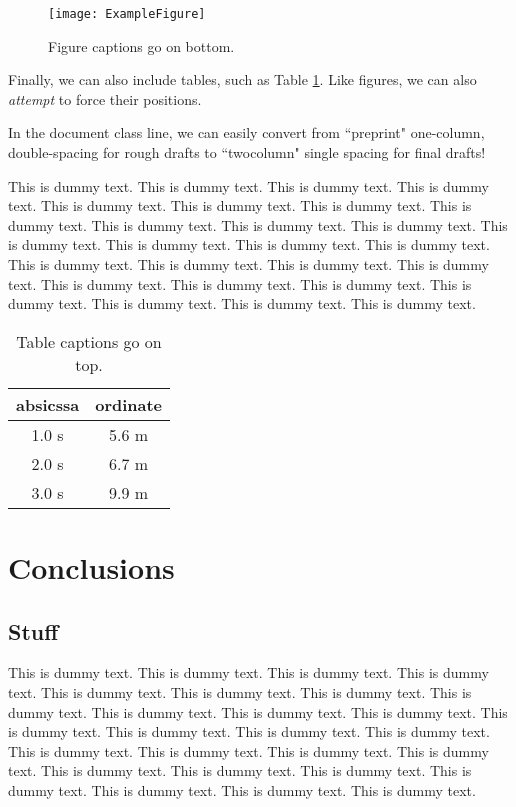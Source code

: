 \documentclass{book}
\begin{document}
\begin{figure}[ht] %
	\begin{center}
		\texttt{[image: ExampleFigure]} %
		\caption{Figure captions go on bottom.}
		\label{SchematicDiagram}
	\end{center}
\end{figure}

Finally, we can also include tables, such as Table \ref{demoTable}. Like figures, we can also \emph{attempt} to force their positions. 

In the document class line, we can easily convert from ``preprint" one-column, double-spacing for rough drafts to ``twocolumn" single spacing for final drafts! 

This is dummy text. This is dummy text. This is dummy text. This is dummy text. This is dummy text. This is dummy text. This is dummy text. This is dummy text. This is dummy text. This is dummy text. This is dummy text. This is dummy text. This is dummy text. This is dummy text. This is dummy text. This is dummy text. This is dummy text. This is dummy text. This is dummy text. This is dummy text. This is dummy text. This is dummy text. This is dummy text. This is dummy text. This is dummy text. This is dummy text. 

\begin{table}[h] %
	\caption{Table captions go on top.}
	\label{demoTable}
	\begin{center}
		\begin{tabular}{cc} %
			absicssa & ordinate\\
			\hline
			1.0 s & 5.6 m\\
			2.0 s & 6.7 m\\
			3.0 s & 9.9 m
		\end{tabular}
	\end{center}
\end{table}

\chapter{Conclusions}\label{Conclusions}

\section{Stuff}
This is dummy text. This is dummy text. This is dummy text. This is dummy text. This is dummy text. This is dummy text. This is dummy text. This is dummy text. This is dummy text. This is dummy text. This is dummy text. This is dummy text. This is dummy text. This is dummy text. This is dummy text. This is dummy text. This is dummy text. This is dummy text. This is dummy text. This is dummy text. This is dummy text. This is dummy text. This is dummy text. This is dummy text. This is dummy text. This is dummy text. 
\end{document}
